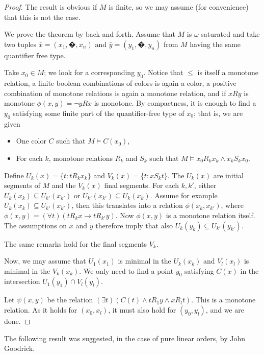 \documentclass[english]{article}
\theoremstyle{definition}
\theoremstyle{mystyle}
\theoremstyle{remark}
\begin{document}
\begin{proof}
The result is obvious if $M$ is finite, so we may assume (for convenience) that this is not the case.

We prove the theorem by back-and-forth. Assume that $M$ is $\omega$-saturated and take two tuples $\bar x = (x_1,�,x_n)$ and $\bar y = (y_1,�,y_n)$ from $M$ having the same quantifier free type.

Take $x_0 \in M$; we look for a corresponding $y_0$. Notice that $\leq$ is itself a monotone relation, a finite boolean combinations of colors is again a color, a positive combination of monotone relations is again a monotone relation, and if $xRy$ is monotone $\phi(x,y)=\neg yRx$ is monotone.
By compactness, it is enough to find a $y_0$ satisfying some finite part of the quantifier-free type of $x_0$; that is, we are given
\begin{itemize}
\item One color $C$ such that $M \models C(x_0)$,
\item For each $k$, monotone relations $R_k$ and $S_k$ such that $M \models x_0 R_k x_k \wedge x_k S_k x_0$.
\end{itemize}
\vspace{3pt}
Define $U_k(x) = \{t : t R_k x_k\} $ and $V_k(x) = \{t : x S_k t\}$. The $U_k(x)$ are initial segments of $M$ and the $V_k(x)$ final segments. For each $k,k'$, either $U_k(x_k)\subseteq U_{k'}(x_{k'})$ or $U_{k'}(x_{k'}) \subseteq U_k(x_k)$. Assume for example $U_k(x_k) \subseteq U_{k'}(x_{k'})$, then this translates into a relation $\phi(x_k,x_{k'})$, where $\phi(x,y) = (\forall t)(t R_k x \rightarrow t R_{k'} y)$. Now $\phi(x,y)$ is a monotone relation itself. The assumptions on $\bar x$ and $\bar y$ therefore imply that also $U_k(y_k) \subseteq U_{k'}(y_{k'})$.

The same remarks hold for the final segments $V_k$.

Now, we may assume that $U_1(x_1)$ is minimal in the $U_k(x_k)$ and $V_l(x_l)$ is minimal in the $V_k(x_k)$. We only need to find a point $y_0$ satisfying $C(x)$ in the intersection $U_1(y_1) \cap V_l(y_l)$.

Let $\psi(x,y)$ be the relation $(\exists t)(C(t) \wedge t R_1 y \wedge x R_l t)$. This is a monotone relation. As it holds for $(x_0,x_l)$, it must also hold for $(y_0,y_l)$, and we are done.
\end{proof}

The following result was suggested, in the case of pure linear orders, by John Goodrick.
\end{document}
